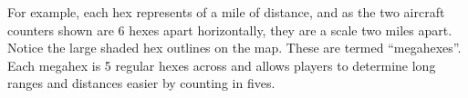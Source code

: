 For example,  each hex represents {\onethird} of a mile of distance, and as the two aircraft counters shown are 6 hexes apart horizontally, they are a scale two miles apart. 
Notice the large shaded hex outlines on the map. These are termed “megahexes”. Each megahex is 5 regular hexes across and allows players to determine long ranges and distances easier by counting in fives. 




